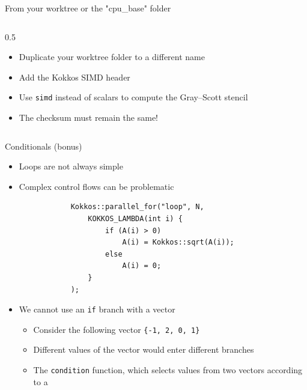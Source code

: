 \documentclass[
    aspectratio=169,
]{beamer}
\begin{document}
\begin{exerciseframe}{\small From your worktree or the "cpu\_base" folder}
\begin{columns}
    \begin{column}{0.5\linewidth}
        \begin{itemize}
            \item Duplicate your worktree folder to a different name
            \item Add the Kokkos SIMD header
            \item Use \texttt{simd} instead of scalars to compute the Gray--Scott stencil
            \item The checksum must remain the same!
        \end{itemize}
    \end{column}
\end{columns}
\end{exerciseframe}

\begin{frame}[fragile]{Conditionals (bonus)}
    \begin{itemize}
        \item Loops are not always simple
        \item Complex control flows can be problematic
        \begin{verbatim}
            Kokkos::parallel_for("loop", N,
                KOKKOS_LAMBDA(int i) {
                    if (A(i) > 0)
                        A(i) = Kokkos::sqrt(A(i));
                    else
                        A(i) = 0;
                }
            );
        \end{verbatim}
        \item We cannot use an \texttt{if} branch with a vector
        \begin{itemize}
            \item Consider the following vector \texttt{\{-1, 2, 0, 1\}}
            \item Different values of the vector would enter different branches
            \item The \texttt{condition} function, which selects values from two vectors according to a 
        \end{itemize}
    \end{itemize}
\end{frame}
\end{document}
